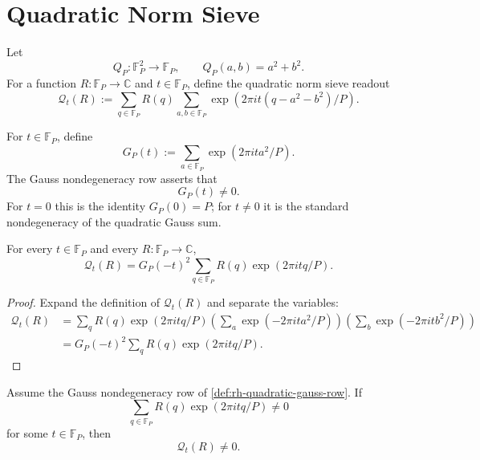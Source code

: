 \section{Quadratic Norm Sieve}
\label{sec:rh-finite-prime-circle-universe-quadratic}

\begin{definition}
\label{def:rh-finite-prime-circle-quadratic-norm-sieve}
Let
$$
Q_P:\mathbb F_P^2\to\mathbb F_P,
\qquad
Q_P(a,b)=a^2+b^2.
$$
For a function $R:\mathbb F_P\to\mathbb C$ and $t\in\mathbb F_P$, define
the quadratic norm sieve readout
$$
\mathcal Q_t(R)
:=
\sum_{q\in\mathbb F_P}
R(q)
\sum_{a,b\in\mathbb F_P}
\exp(2\pi i t(q-a^2-b^2)/P).
$$
\end{definition}

\begin{definition}
\label{def:rh-quadratic-gauss-row}
For $t\in\mathbb F_P$, define
$$
G_P(t):=\sum_{a\in\mathbb F_P}\exp(2\pi i t a^2/P).
$$
The Gauss nondegeneracy row asserts that
$$
G_P(t)\ne0.
$$
For $t=0$ this is the identity $G_P(0)=P$; for $t\ne0$ it is the
standard nondegeneracy of the quadratic Gauss sum.
\end{definition}

\begin{theorem}
\label{thm:rh-quadratic-norm-sieve-fourier-gauss-factorization}
For every $t\in\mathbb F_P$ and every $R:\mathbb F_P\to\mathbb C$,
$$
\mathcal Q_t(R)
=
G_P(-t)^2
\sum_{q\in\mathbb F_P}R(q)\exp(2\pi i tq/P).
$$
\end{theorem}

\begin{proof}
Expand the definition of $\mathcal Q_t(R)$ and separate the variables:
$$
\begin{aligned}
\mathcal Q_t(R)
&=
\sum_q R(q)\exp(2\pi i tq/P)
\left(\sum_a\exp(-2\pi i t a^2/P)\right)
\left(\sum_b\exp(-2\pi i t b^2/P)\right)\\
&=
G_P(-t)^2
\sum_q R(q)\exp(2\pi i tq/P).
\end{aligned}
$$
\end{proof}

\begin{corollary}
\label{cor:rh-quadratic-norm-sieves-detect-fourier-visible-residuals}
Assume the Gauss nondegeneracy row of
\autoref{def:rh-quadratic-gauss-row}.  If
$$
\sum_{q\in\mathbb F_P}R(q)\exp(2\pi i tq/P)\ne0
$$
for some $t\in\mathbb F_P$, then
$$
\mathcal Q_t(R)\ne0.
$$
\end{corollary}

